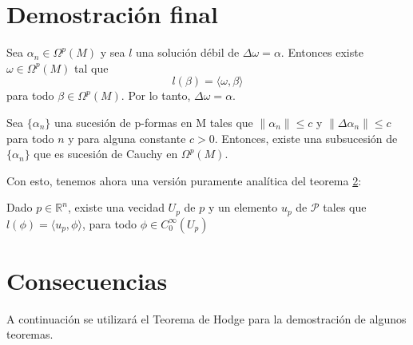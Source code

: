 \section{Demostración final}%

\begin{teo}[Regularidad]
Sea $\alpha_n \in \Omega^p(M)$ y sea $l$ una solución débil de $\Delta\omega = \alpha$. Entonces existe $\omega \in \Omega^p(M)$ tal que
\[l(\beta) = \langle \omega, \beta\rangle\]
para todo $\beta \in \Omega^p(M)$. Por lo tanto, $\Delta\omega = \alpha$.
\end{teo}




\begin{teo}
Sea $\{\alpha_n\}$ una sucesión de p-formas en M tales que $\|\alpha_n\| \leq c$ y $\|\Delta\alpha_n\| \leq c$ para todo $n$ y para alguna constante $c > 0$. Entonces, existe una subsucesión de $\{\alpha_n\}$ que es sucesión de Cauchy en $\Omega^p(M)$.
\end{teo}


Con esto, tenemos ahora una versión puramente analítica del teorema \ref{}:


\begin{teo}[Regularidad]
Dado $p \in \mathbb{R}^n$, existe una vecidad $U_p$ de $p$ y un elemento $u_p$ de $\mathcal{P}$ tales que $l(\phi) = \langle u_p, \phi\rangle$, para todo $\phi \in C_0^\infty(U_p)$
\end{teo}



%
\section{Consecuencias}%
A continuación se utilizará el Teorema de Hodge para la demostración de algunos teoremas.
